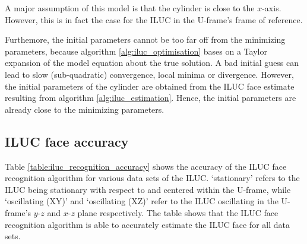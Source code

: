 A major assumption of this model is that the cylinder is close to the $x$-axis. However, this is in fact the case for the ILUC in the U-frame's frame of reference.

Furthemore, the initial parameters cannot be too far off from the minimizing parameters, because algorithm \ref{alg:iluc_optimisation} bases on a Taylor expansion of the model equation about the true solution. A bad initial guess can lead to slow (sub-quadratic) convergence, local minima or divergence. However, the initial parameters of the cylinder are obtained from the ILUC face estimate resulting from algorithm \ref{alg:iluc_estimation}. Hence, the initial parameters are already close to the minimizing parameters.

\subsection{ILUC face accuracy}
Table \ref{table:iluc_recognition_accuracy} shows the accuracy of the ILUC face recognition algorithm for various data sets of the ILUC. `stationary' refers to the ILUC being stationary with respect to and centered within the U-frame, while `oscillating (XY)' and `oscillating (XZ)' refer to the ILUC oscillating in the U-frame's $y$-$z$ and $x$-$z$ plane respectively. The table shows that the ILUC face recognition algorithm is able to accurately estimate the ILUC face for all data sets.
